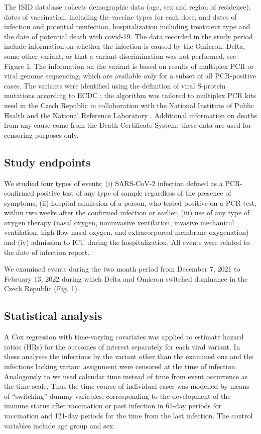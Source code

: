 \documentclass[a4paper,12pt]{article}
\def\figdiscrim{1}
\begin{document}
The ISID database collects demographic data (age, sex and region of residence), dates of vaccination, including the vaccine types for each dose, and dates of infection and potential reinfection, hospitalization including treatment type and the date of potential death with covid-19. The data recorded in the study period include information on whether the infection is caused by the Omicron, Delta, some other variant, or that a variant discrimination was not performed, see Figure \figdiscrim. The information on the variant is based on results of multiplex PCR or viral genome sequencing, which are available only for a subset of all PCR-positive cases. The variants were identified using the definition of viral S-protein mutations according to ECDC \citep{ECDC_var_concern}; the algorithm was tailored to multiplex PCR kits used in the Czech Republic in collaboration with the National Institute of Public Health and the National Reference Laboratory \citep{SZU_zprava}. Additional information on deaths from any cause come from the Death Certificate System; these data are used for censoring purposes only.

\subsection*{Study endpoints}

We studied four types of events: (i) SARS-CoV-2 infection defined as a PCR-confirmed positive test of any type of sample regardless of the presence of symptoms, (ii) hospital admission of a person, who tested positive on a PCR test, within two weeks after the confirmed infection or earlier, (iii) use of any type of oxygen therapy (nasal oxygen, noninvasive ventilation, invasive mechanical ventilation, high-flow nasal oxygen, and extracorporeal membrane oxygenation) and (iv) admission to ICU during the hospitalization. All events were related to the date of infection report.

We examined events during the two month period from December 7, 2021 to February 13, 2022 during which Delta and Omicron switched dominance in the Czech Republic (Fig. \figdiscrim). 

\subsection*{Statistical analysis}
A Cox regression with time-varying covariates was applied to estimate hazard ratios (HRs) for the outcomes of interest separately for each viral variant. In these analyses the infections by the variant other than the examined one and the infections lacking variant assignment were censored at the time of infection. Analogously to \citep{tartof2021effectiveness} we used calendar time instead of time from event occurrence as the time scale. Thus the time course of individual cases was modelled by means of ``switching'' dummy variables, corresponding to the development of the immune status after vaccination or past infection in 61-day periods for vaccination and 121-day periods for the time from the last infection. The control variables include age group and sex.
\end{document}
